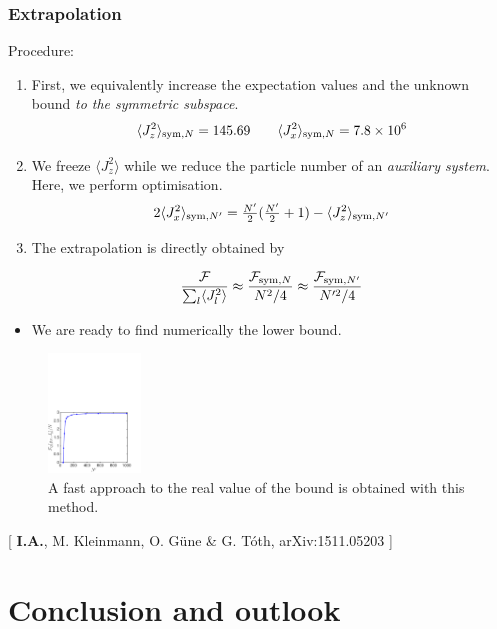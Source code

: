 \documentclass{beamer}
\newcommand{\expect}[1]{\ensuremath{\langle #1 \rangle}}
\newcommand{\citate}[1]{{\footnotesize{\color{gray}[ #1 ]}}

	}
\begin{document}
		\begin{frame}
			\frametitle{Extrapolation}
			Procedure:
			\begin{enumerate}
				\item<1-> First, we equivalently increase the expectation values and the unknown bound \emph{\color{blue}to the symmetric subspace}.
					\[
						\expect{J_z^2}_{{\rm sym},N} = 145.69 \qquad
						\expect{J_x^2}_{{\rm sym},N} = 7.8 \times 10^6
					\]
				\item<2-> We freeze $\expect{J_z^2}$ while we reduce the particle number of an \emph{\color{blue}auxiliary system}. Here, we perform optimisation.
					\[ 2\expect{J_x^2}_{{\rm sym},N'} = \tfrac{N'}{2}(\tfrac{N'}{2}+1)- \expect{J_z^2}_{{\rm sym},N'} \]
				\item<3-> The extrapolation is directly obtained by
				\begin{block}
					{}
					\[ \frac{\mathcal{F}}{\sum_l \expect{J_l^2}}\approx  \frac{\mathcal{F}_{{\rm sym},N}}{N^2/4} \approx \frac{\mathcal{F}_{{\rm sym},N'}}{N'^2/4}
					\]
				\end{block}
			\end{enumerate}
		\end{frame}

		\begin{frame}
			\begin{itemize}
				\item We are ready to find numerically the lower bound.
			\end{itemize}
			\begin{figure}
				\includegraphics[height=120px]{img/asymptoticapproach-dicke.pdf}
				\caption{A fast approach to the real value of the bound is obtained with this method.}
			\end{figure}
			\vspace{-15px}
			\citate{{\bf I.A.}, M. Kleinmann, O. G\"une \& G. T\'oth, arXiv:1511.05203}
		\end{frame}

\section{Conclusion and outlook}
\end{document}
